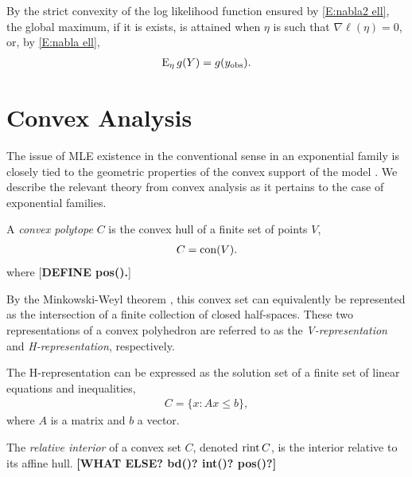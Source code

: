 By the strict convexity of the log likelihood function ensured by \eqref{E:nabla2 
ell}, the global 
maximum, if it is exists, is attained when $\eta$ is such that $\nabla \ell( \eta ) = 
0$, or, by \eqref{E:nabla ell},
\begin{align}
	\operatorname{E}_\eta g(Y) = g(y_{\textrm{obs}}). \label{E:Observed-Expected}
\end{align}


\section{Convex Analysis}
The issue of MLE existence in the conventional sense in an exponential family is 
closely tied to the geometric properties of 
the convex support of the model \citep{Barndorff, Geyer:gdor, Rinaldo:2009}.  We 
describe the relevant theory from convex analysis as it pertains to the case of 
exponential families.

A \emph{convex polytope} $C$ is the convex hull of a finite set of points $V$,
\begin{align*}
	C = \operatorname{con}( V ).
\end{align*}
where [\textbf{DEFINE pos().}]

  By the Minkowski-Weyl theorem \citep[Theorem 19.1]{Rockafellar:1970}, this convex 
set can equivalently be represented as the intersection of a finite collection of 
closed half-spaces.  These two representations of a convex polyhedron are referred to 
as the \emph{V-representation} and \emph{H-representation}, respectively.  

The H-representation can be expressed as the solution set of a finite set of linear 
equations and inequalities,
\begin{align*}
	C = \{x: Ax \leq b \},
\end{align*}
where $A$ is a matrix and $b$ a vector.

The \emph{relative interior} of a convex set $C$, denoted $\operatorname{rint} C$, is the interior 
relative to its affine hull.  
\textbf{[WHAT ELSE? bd()?  int()?  pos()?]}

